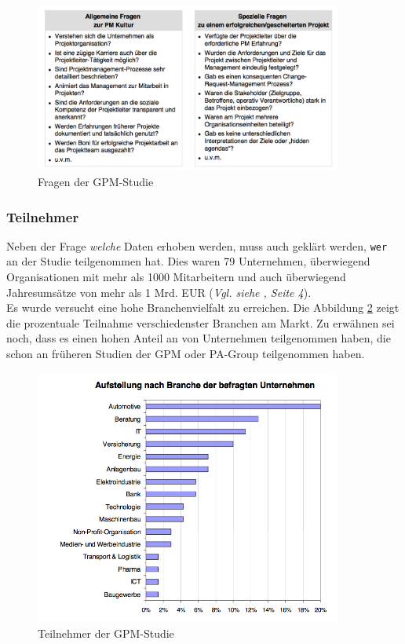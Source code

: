 \documentclass[12pt]{scrartcl}
\begin{document}
\begin{figure}[H]
	\begin{center}
		\includegraphics[width=0.9\textwidth]{img/fragen_gpm_studie}
		\caption{Fragen der GPM-Studie}
		\label{fragen_gpm_studie}	
	\end{center}
\end{figure}

\subsubsection{Teilnehmer}

Neben der Frage \textit{welche} Daten erhoben werden, muss auch geklärt werden, \texttt{wer} an der Studie teilgenommen hat. Dies waren 79 Unternehmen, überwiegend Organisationen mit mehr als 1000 Mitarbeitern und auch überwiegend Jahresumsätze von mehr als 1 Mrd. EUR (\textit{Vgl. siehe \cite{GPM_Studie_2008}, Seite 4}).\\
Es wurde versucht eine hohe Branchenvielfalt zu erreichen. Die Abbildung \ref{teilnehmer_gpm_studie} zeigt die prozentuale Teilnahme verschiedenster Branchen am Markt. Zu erwähnen sei noch, dass es einen hohen Anteil an von Unternehmen teilgenommen haben, die schon an früheren Studien der GPM oder PA-Group teilgenommen haben. 

\begin{figure}[H]
	\begin{center}
		\includegraphics[width=0.9\textwidth]{img/teilnehmer_gpm_studie}
		\caption{Teilnehmer der GPM-Studie}
		\label{teilnehmer_gpm_studie}	
	\end{center}
\end{figure}
\end{document}
